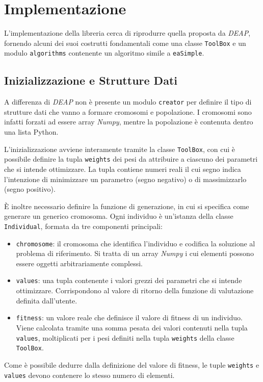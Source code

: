 \section{Implementazione}

L'implementazione della libreria cerca di riprodurre quella proposta da
\textit{DEAP}, fornendo alcuni dei suoi costrutti fondamentali come una classe
\verb|ToolBox| e un modulo \verb|algorithms| contenente un algoritmo simile a
\verb|eaSimple|.

\subsection{Inizializzazione e Strutture Dati}

A differenza di \textit{DEAP} non è presente un modulo \verb|creator| per
definire il tipo di strutture dati che vanno a formare cromosomi e popolazione.
I cromosomi sono infatti forzati ad essere array \textit{Numpy}, mentre la
popolazione è contenuta dentro una lista Python.

L'inizializzazione avviene interamente tramite la classe \verb|ToolBox|, con
cui è possibile definire la tupla \verb|weights| dei pesi da attribuire a
ciascuno dei parametri che si intende ottimizzare. La tupla contiene numeri
reali il cui segno indica l'intenzione di minimizzare un parametro (segno
negativo) o di massimizzarlo (segno positivo).

È inoltre necessario definire la funzione di generazione, in cui si specifica
come generare un generico cromosoma. Ogni individuo è un'istanza della classe
\verb|Individual|, formata da tre componenti principali:
\begin{itemize}
	\item \verb|chromosome|: il cromosoma che identifica l'individuo e codifica
	      la soluzione al problema di riferimento. Si tratta di un array
	      \textit{Numpy} i cui elementi possono essere oggetti arbitrariamente
	      complessi.
	\item \verb|values|: una tupla contenente i valori grezzi dei parametri che
	      si intende ottimizzare. Corrispondono al valore di ritorno della
	      funzione di valutazione definita dall'utente.
	\item \verb|fitness|: un valore reale che definisce il valore di fitness di
	      un individuo. Viene calcolata tramite una somma pesata dei valori
	      contenuti nella tupla \verb|values|, moltiplicati per i pesi definiti
	      nella tupla \verb|weights| della classe \verb|ToolBox|.
\end{itemize}
Come è possibile dedurre dalla definizione del valore di fitness, le tuple
\verb|weights| e \verb|values| devono contenere lo stesso numero di elementi.

